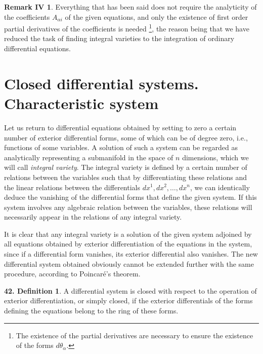 \documentclass[leqno,11pt]{book}
\numberwithin{equation}{chapter}
\theoremstyle{shape1}
\theoremstyle{shape0}
\theoremstyle{shape2}
\theoremstyle{definition}
\begin{document}
\newtheorem*{rmkiv}{\hspace{15pt}Remark IV}
\begin{rmkiv}
  Everything that has been said does not require the analyticity of the coefficients $A_{\alpha i}$ of the given equations, and only the existence of first order partial derivatives of the coefficients is needed \footnote{The existence of the partial derivatives are necessary  to ensure the existence of the forms $d\theta_{\alpha}$.}, the reason being that we have reduced the task of finding  integral varieties to the integration of ordinary differential equations.
\end{rmkiv}

\section{Closed differential systems. Characteristic system}
\label{sec:clos-diff-syst}

\fsec Let us return to differential equations obtained by setting to zero a certain number of exterior differential forms, some of which can be of degree zero, {i.e.,} functions of some variables. A solution of such a system can be regarded as analytically representing  a submanifold in the space of $n$ dimensions, which we will call \emph{integral variety}. The integral variety is defined by a certain number of relations between the variables such that by differentiating these relations and the linear relations between the differentials $dx^{1},dx^{2},\dots,dx^{n}$, we can identically deduce the  vanishing of the differential forms that define the given system. If this system involves any algebraic relation between the variables, these relations will necessarily appear in the relations of any integral variety.

It is clear that any integral variety is a solution of the given system adjoined by all equations obtained by exterior differentiation of the equations in the system, since if a differential form vanishes, its exterior differential also vanishes. The new differential system obtained  obviously cannot be extended further with the same procedure, according to Poincar\'e's theorem.

\vspace{12pt}\addtocounter{frenchsec}{1}
\theoremstyle{shape1}
\newtheorem*{dfn42}{\hspace{15pt}\textbf{42.} Definition}
\begin{dfn42}
  A differential system is closed with respect to the operation of exterior differentiation, or simply closed, if the exterior differentials of the forms defining the equations belong to the ring of these forms.
\end{dfn42}
\end{document}
